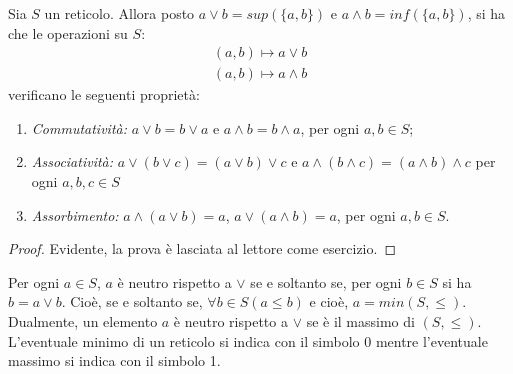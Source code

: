 \begin{propbox}
	Sia $S$ un reticolo. Allora posto $a \vee b = sup(\{a,b\})$ e $a \wedge b = inf(\{a,b\})$, si ha che le operazioni su $S$:
	\begin{eqnarray}
		(a,b) \mapsto a \vee b \\
		(a,b) \mapsto a \wedge b	
	\end{eqnarray}
verificano le seguenti proprietà:
\begin{enumerate}
	\item \textit{Commutatività:} $a \vee b = b \vee a$ e $a \wedge b = b \wedge a$, per ogni $a,b \in S$;
	\item \textit{Associatività:} $a \vee (b \vee c) = (a \vee b) \vee c$ e $a \wedge (b \wedge c) = (a \wedge b) \wedge c$ per ogni $a,b,c \in S$
	\item \textit{Assorbimento:} $a \wedge ( a \vee b) = a$, $a \vee (a \wedge b) = a$, per ogni $a,b \in S$.
\end{enumerate}
\end{propbox}
\begin{proof}
	Evidente, la prova è lasciata al lettore come esercizio.
\end{proof}
\begin{osservation}
	Per ogni $a \in S$, $a$ è neutro rispetto a $\vee$ se e soltanto se, per ogni $b \in S$ si ha $b = a \vee b$. Cioè, se e soltanto se, $\forall b \in S (a \leq b)$ e cioè, $a = min(S,\leq)$. Dualmente, un elemento $a$ è neutro rispetto a $\vee$ se è il massimo di $(S,\leq)$. L'eventuale minimo di un reticolo si indica con il simbolo $0$ mentre l'eventuale massimo si indica con il simbolo 1.
\end{osservation}


